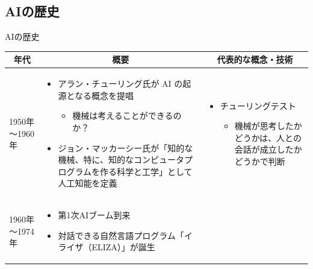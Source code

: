 \documentclass[dvipdfmx,aspectratio=169]{beamer}
\begin{document}
	\subsection{AIの歴史}
	\begin{frame}[shrink]{AIの歴史}
		\begin{table}[h]
			\centering
			\begin{tabular}{lp{35em}p{40em}}
				\toprule
				\multicolumn{1}{c}{年代} & \multicolumn{1}{c}{概要} & \multicolumn{1}{c}{代表的な概念・技術} \\
				\midrule
				1950年～1960年            & \begin{minipage}{35em}
												\begin{itemize}
													\item アラン・チューリング氏が AI の起源となる概念を提唱
													\begin{itemize}
														\item 機械は考えることができるのか？
													\end{itemize}
													\item ジョン・マッカーシー氏が「知的な機械、特に、知的なコンピュータプログラムを作る科学と工学」として人工知能を定義
												\end{itemize}
											\end{minipage} & \begin{minipage}{40em}
												\begin{itemize}
													\item \alert{チューリングテスト}
													\begin{itemize}
														\item 機械が思考したかどうかは、人との会話が成立したかどうかで判断
													\end{itemize}
												\end{itemize}
											\end{minipage} \\
				\midrule
				1960年～1974年            & \begin{minipage}{35em}
												\begin{itemize}
													\item 第1次AIブーム到来
													\item 対話できる自然言語プログラム「\alert{イライザ}（ELIZA）」が誕生
												\end{itemize}
											\end{minipage}
										& \begin{minipage}{40em}

\end{minipage}
\end{tabular}
\end{table}
\end{frame}
\end{document}
